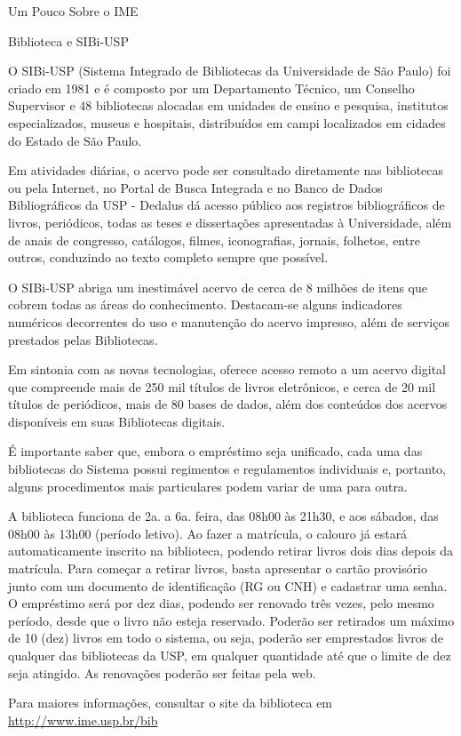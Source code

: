 \begin{secao}{Um Pouco Sobre o IME}
\begin{subsecao}{Biblioteca e SIBi-USP}

O SIBi-USP (Sistema Integrado de Bibliotecas da Universidade de São Paulo) foi
criado em 1981 e é composto por um Departamento Técnico, um Conselho Supervisor
e 48 bibliotecas alocadas em unidades de ensino e pesquisa, institutos
especializados, museus e hospitais, distribuídos em campi localizados em
cidades do Estado de São Paulo.

Em atividades diárias, o acervo pode ser consultado diretamente nas bibliotecas
ou pela Internet, no Portal de Busca Integrada e no Banco de Dados
Bibliográficos da USP - Dedalus dá acesso público aos registros bibliográficos
de livros, periódicos, todas as teses e dissertações apresentadas à
Universidade, além de anais de congresso, catálogos, filmes, iconografias,
jornais, folhetos, entre outros, conduzindo ao texto completo sempre que
possível.

O SIBi-USP abriga um inestimável acervo de cerca de 8 milhões de itens que
cobrem todas as áreas do conhecimento. Destacam-se alguns indicadores numéricos
decorrentes do uso e manutenção do acervo impresso, além de serviços prestados
pelas Bibliotecas.

Em sintonia com as novas tecnologias, oferece acesso remoto a um acervo digital
que compreende mais de 250 mil títulos de livros eletrônicos, e cerca de 20 mil
títulos de periódicos, mais de 80 bases de dados, além dos conteúdos dos acervos
disponíveis em suas Bibliotecas digitais.

É importante saber que, embora o empréstimo seja unificado, cada uma das
bibliotecas do Sistema possui regimentos e regulamentos individuais e, portanto,
alguns procedimentos mais particulares podem variar de uma para outra.

A biblioteca funciona de 2a. a 6a. feira, das 08h00 às 21h30, e aos sábados, das
08h00 às 13h00 (período letivo). Ao fazer a matrícula, o calouro já estará
automaticamente inscrito na biblioteca, podendo retirar livros dois dias depois
da matrícula. Para começar a retirar livros, basta apresentar o cartão
provisório junto com um documento de identificação (RG ou CNH) e cadastrar uma
senha. O empréstimo será por dez dias, podendo ser renovado três vezes, pelo
mesmo período, desde que o livro não esteja reservado. Poderão ser retirados um
máximo de 10 (dez) livros em todo o sistema, ou seja, poderão ser emprestados
livros de qualquer das bibliotecas da USP, em qualquer quantidade até que o
limite de dez seja atingido. As renovações poderão ser feitas pela web.

Para maiores informações, consultar o site da biblioteca em
\url{http://www.ime.usp.br/bib}

\end{subsecao}
\end{secao}
